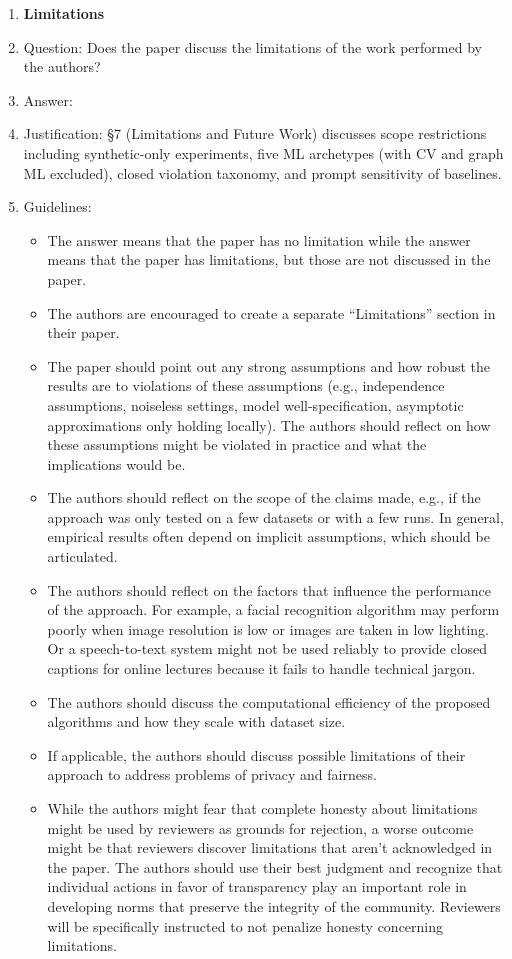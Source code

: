 \begin{enumerate}
\item {\bf Limitations}
    \item[] Question: Does the paper discuss the limitations of the work performed by the authors?
    \item[] Answer: \answerYes{}
    \item[] Justification: \S7 (Limitations and Future Work) discusses scope restrictions including synthetic-only experiments, five ML archetypes (with CV and graph ML excluded), closed violation taxonomy, and prompt sensitivity of baselines.
    \item[] Guidelines: \begin{itemize}
        \item The answer \answerNA{} means that the paper has no limitation while the answer \answerNo{} means that the paper has limitations, but those are not discussed in the paper.
        \item The authors are encouraged to create a separate ``Limitations'' section in their paper.
        \item The paper should point out any strong assumptions and how robust the results are to violations of these assumptions (e.g., independence assumptions, noiseless settings, model well-specification, asymptotic approximations only holding locally). The authors should reflect on how these assumptions might be violated in practice and what the implications would be.
        \item The authors should reflect on the scope of the claims made, e.g., if the approach was only tested on a few datasets or with a few runs. In general, empirical results often depend on implicit assumptions, which should be articulated.
        \item The authors should reflect on the factors that influence the performance of the approach. For example, a facial recognition algorithm may perform poorly when image resolution is low or images are taken in low lighting. Or a speech-to-text system might not be used reliably to provide closed captions for online lectures because it fails to handle technical jargon.
        \item The authors should discuss the computational efficiency of the proposed algorithms and how they scale with dataset size.
        \item If applicable, the authors should discuss possible limitations of their approach to address problems of privacy and fairness.
        \item While the authors might fear that complete honesty about limitations might be used by reviewers as grounds for rejection, a worse outcome might be that reviewers discover limitations that aren't acknowledged in the paper. The authors should use their best judgment and recognize that individual actions in favor of transparency play an important role in developing norms that preserve the integrity of the community. Reviewers will be specifically instructed to not penalize honesty concerning limitations.
    \end{itemize}


\end{enumerate}
